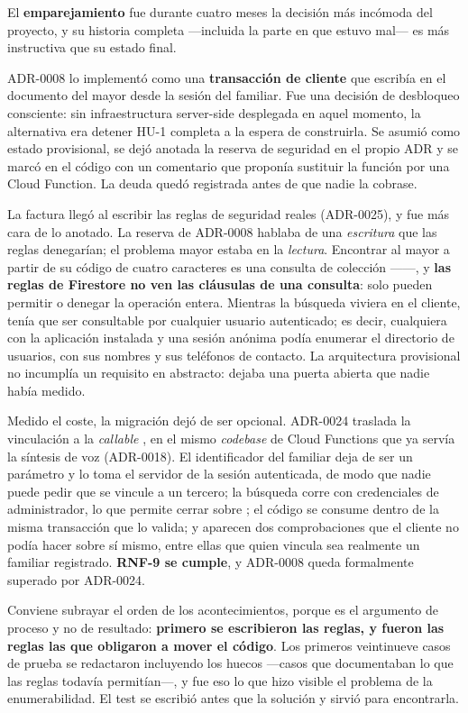 El \textbf{emparejamiento} fue durante cuatro meses la decisión más incómoda del proyecto, y su historia
completa ---incluida la parte en que estuvo mal--- es más instructiva que su estado final.

ADR-0008 lo implementó como una \textbf{transacción de cliente} que escribía en el documento del mayor
desde la sesión del familiar. Fue una decisión de desbloqueo consciente: sin infraestructura server-side
desplegada en aquel momento, la alternativa era detener HU-1 completa a la espera de construirla. Se asumió
como estado provisional, se dejó anotada la reserva de seguridad en el propio ADR y se marcó en el código
con un comentario que proponía sustituir la función por una Cloud Function. La deuda quedó registrada antes
de que nadie la cobrase.

La factura llegó al escribir las reglas de seguridad reales (ADR-0025), y fue más cara de lo anotado. La
reserva de ADR-0008 hablaba de una \emph{escritura} que las reglas denegarían; el problema mayor estaba en
la \emph{lectura}. Encontrar al mayor a partir de su código de cuatro caracteres es una consulta de
colección ------, y \textbf{las reglas de Firestore no ven las cláusulas
de una consulta}: solo pueden permitir o denegar la operación entera. Mientras la búsqueda viviera en el
cliente,  tenía que ser consultable por cualquier usuario autenticado; es decir, cualquiera con
la aplicación instalada y una sesión anónima podía enumerar el directorio de usuarios, con sus nombres y sus
teléfonos de contacto. La arquitectura provisional no incumplía un requisito en abstracto: dejaba una puerta
abierta que nadie había medido.

Medido el coste, la migración dejó de ser opcional. ADR-0024 traslada la vinculación a la \emph{callable}
, en el mismo \emph{codebase} de Cloud Functions que ya servía la síntesis de voz
(ADR-0018). El identificador del familiar deja de ser un parámetro y lo toma el servidor de la sesión
autenticada, de modo que nadie puede pedir que se vincule a un tercero; la búsqueda corre con credenciales
de administrador, lo que permite cerrar  sobre ; el código se consume dentro
de la misma transacción que lo valida; y aparecen dos comprobaciones que el cliente no podía hacer sobre sí
mismo, entre ellas que quien vincula sea realmente un familiar registrado. \textbf{RNF-9 se cumple}, y
ADR-0008 queda formalmente superado por ADR-0024.

Conviene subrayar el orden de los acontecimientos, porque es el argumento de proceso y no de resultado:
\textbf{primero se escribieron las reglas, y fueron las reglas las que obligaron a mover el código}. Los
primeros veintinueve casos de prueba se redactaron incluyendo los huecos ---casos que documentaban lo que
las reglas todavía permitían---, y fue eso lo que hizo visible el problema de la enumerabilidad. El test se
escribió antes que la solución y sirvió para encontrarla.

